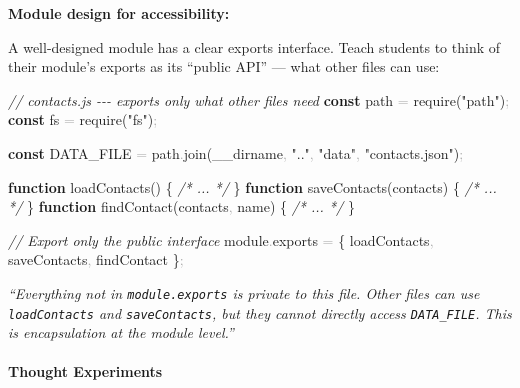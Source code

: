 \documentclass[
  justified,
  openright,
]{tufte-book}
\let\paragraph\paragraph
\newcommand{\KeywordTok}[1]{\textcolor{CodeKeyword}{\textbf{#1}}}  %
\newcommand{\StringTok}[1]{\textcolor{CodeString}{#1}}              %
\newcommand{\CommentTok}[1]{\textcolor{CodeComment}{\textit{#1}}}  %
\newcommand{\CodeFuncTok}[1]{\textcolor{CodeKeyword}{#1}}           %
\newcommand{\CodeTypeTok}[1]{\textcolor{CodeType}{#1}}              %
\newcommand{\CodeAccentTok}[1]{\textcolor{CodeAccent}{#1}}          %
\newcommand{\OperatorTok}[1]{\textcolor{DarkGray}{#1}}              %
\newenvironment{Shaded}{%
  \begin{mdframed}[style=TufteCode]%
}{%
  \end{mdframed}%
}
\let\paragraph\paragraph
\begin{document}
\textbf{Module design for accessibility:}

A well-designed module has a clear exports interface. Teach students to
think of their module's exports as its ``public API'' --- what other
files can use:

\begin{Shaded}
\begin{Highlighting}[]
\CommentTok{// contacts.js {-}{-}{-} exports only what other files need}
\KeywordTok{const} path \OperatorTok{=} \CodeAccentTok{require}(\StringTok{"path"})\OperatorTok{;}
\KeywordTok{const} fs \OperatorTok{=} \CodeAccentTok{require}(\StringTok{"fs"})\OperatorTok{;}
 
\KeywordTok{const} DATA\_FILE \OperatorTok{=} path\OperatorTok{.}\CodeFuncTok{join}(\_\_dirname\OperatorTok{,} \StringTok{".."}\OperatorTok{,} \StringTok{"data"}\OperatorTok{,} \StringTok{"contacts.json"})\OperatorTok{;}
 
\KeywordTok{function} \CodeFuncTok{loadContacts}() \{
  \CommentTok{/* ... */}
\}
\KeywordTok{function} \CodeFuncTok{saveContacts}(contacts) \{
  \CommentTok{/* ... */}
\}
\KeywordTok{function} \CodeFuncTok{findContact}(contacts\OperatorTok{,} name) \{
  \CommentTok{/* ... */}
\}
 
\CommentTok{// Export only the public interface}
module\OperatorTok{.}\CodeTypeTok{exports} \OperatorTok{=} \{ loadContacts\OperatorTok{,} saveContacts\OperatorTok{,} findContact \}\OperatorTok{;}
\end{Highlighting}
\end{Shaded}

\emph{``Everything not in \texttt{module.exports} is private to this
file. Other files can use \texttt{loadContacts} and
\texttt{saveContacts}, but they cannot directly access
\texttt{DATA\_FILE}. This is encapsulation at the module level.''}

\paragraph{Thought Experiments}\label{thought-experiments-27}
\end{document}
